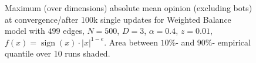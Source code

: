 \documentclass[11pt]{article}
\DeclareMathOperator{\sign}{sign}
\begin{document}
\begin{figure}[!htb]
\begin{center}
\end{center}
\caption{
Maximum (over dimensions) absolute mean opinion (excluding bots) at convergence/after 100k single updates for Weighted Balance model with $499$ edges, $N=500$, $D=3$, $\alpha=0.4$, $z=0.01$, $f(x)=\sign(x)\cdot|x|^{1-e}$. Area between $10\%$- and $90\%$- empirical quantile over 10 runs shaded. 
}
\label{bots_mean}
\end{figure}
\end{document}
